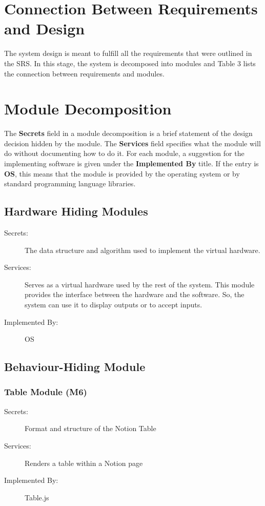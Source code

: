 \documentclass[12pt, titlepage]{article}
\begin{document}
\section{Connection Between Requirements and Design} 
The system design is meant to fulfill all the requirements that were outlined in the SRS. In this stage, the system is decomposed into modules and Table 3 lists the connection between requirements and modules.


\section{Module Decomposition}
The \textbf{Secrets} field in a module decomposition is a brief statement of the design decision hidden by the module. The \textbf{Services} field specifies what the module will do without documenting how to do it. For each module, a suggestion for the implementing software is given under the \textbf{Implemented By} title. If the entry is \textbf{OS}, this means that the module is provided by the operating system or by standard programming language libraries. 

\subsection{Hardware Hiding Modules }
\begin{description}
\item[Secrets:]The data structure and algorithm used to implement the virtual
  hardware.
\item[Services:]Serves as a virtual hardware used by the rest of the
  system. This module provides the interface between the hardware and the
  software. So, the system can use it to display outputs or to accept inputs.
\item[Implemented By:] OS
\end{description}

\subsection{Behaviour-Hiding Module}

\subsubsection{Table Module (M6)}

\begin{description}
\item[Secrets:] Format and structure of the Notion Table
\item[Services:] Renders a table within a Notion page
\item[Implemented By:] Table.js
\end{description}
\end{document}

